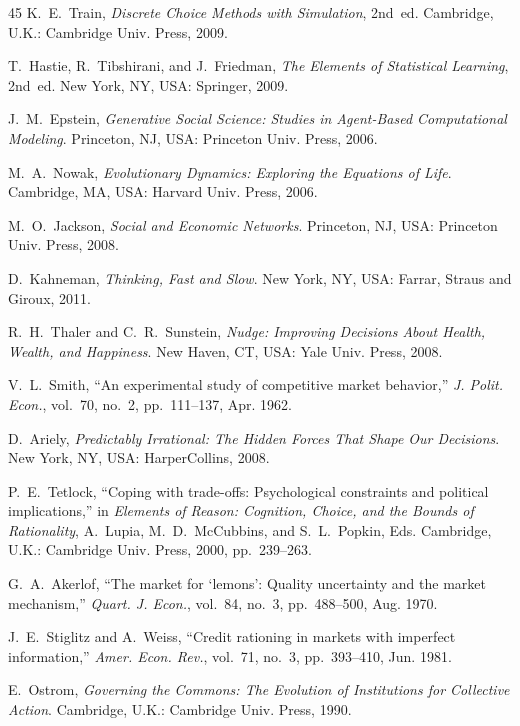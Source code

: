 \documentclass[journal]{IEEEtran}
\begin{document}
\begin{thebibliography}{45}
K.~E.~Train, \emph{Discrete Choice Methods with Simulation}, 2nd~ed.
Cambridge, U.K.: Cambridge Univ. Press, 2009.

T.~Hastie, R.~Tibshirani, and J.~Friedman, \emph{The Elements of Statistical Learning}, 2nd~ed.
New York, NY, USA: Springer, 2009.

J.~M.~Epstein, \emph{Generative Social Science: Studies in Agent-Based Computational Modeling}.
Princeton, NJ, USA: Princeton Univ. Press, 2006.

M.~A.~Nowak, \emph{Evolutionary Dynamics: Exploring the Equations of Life}.
Cambridge, MA, USA: Harvard Univ. Press, 2006.

M.~O.~Jackson, \emph{Social and Economic Networks}.
Princeton, NJ, USA: Princeton Univ. Press, 2008.

D.~Kahneman, \emph{Thinking, Fast and Slow}.
New York, NY, USA: Farrar, Straus and Giroux, 2011.

R.~H.~Thaler and C.~R.~Sunstein, \emph{Nudge: Improving Decisions About Health, Wealth, and Happiness}.
New Haven, CT, USA: Yale Univ. Press, 2008.

V.~L.~Smith, ``An experimental study of competitive market behavior,''
\emph{J. Polit. Econ.}, vol.~70, no.~2, pp.~111--137, Apr. 1962.

D.~Ariely, \emph{Predictably Irrational: The Hidden Forces That Shape Our Decisions}.
New York, NY, USA: HarperCollins, 2008.

P.~E.~Tetlock, ``Coping with trade-offs: Psychological constraints and political implications,''
in \emph{Elements of Reason: Cognition, Choice, and the Bounds of Rationality},
A.~Lupia, M.~D.~McCubbins, and S.~L.~Popkin, Eds.
Cambridge, U.K.: Cambridge Univ. Press, 2000, pp.~239--263.

G.~A.~Akerlof, ``The market for `lemons': Quality uncertainty and the market mechanism,''
\emph{Quart. J. Econ.}, vol.~84, no.~3, pp.~488--500, Aug. 1970.

J.~E.~Stiglitz and A.~Weiss, ``Credit rationing in markets with imperfect information,''
\emph{Amer. Econ. Rev.}, vol.~71, no.~3, pp.~393--410, Jun. 1981.

E.~Ostrom, \emph{Governing the Commons: The Evolution of Institutions for Collective Action}.
Cambridge, U.K.: Cambridge Univ. Press, 1990.


\end{thebibliography}
\end{document}
